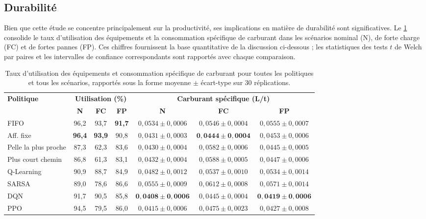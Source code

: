 \documentclass[11pt,a4paper]{article}
\begin{document}
\subsection{Durabilité}
\label{sec:sustainability}

Bien que cette étude se concentre principalement sur la productivité, ses implications en matière de durabilité sont significatives.
Le \cref{tab:efficiency} consolide le taux d'utilisation des équipements et la consommation spécifique de carburant dans les scénarios nominal (N), de forte charge (FC) et de fortes pannes (FP). Ces chiffres fournissent la base quantitative de la discussion ci-dessous ; les statistiques des tests $t$ de Welch par paires et les intervalles de confiance correspondants sont rapportés avec chaque comparaison.

\begin{table}[H]
\centering
\caption{Taux d'utilisation des équipements et consommation spécifique de carburant pour toutes les politiques et tous les scénarios, rapportés sous la forme moyenne $\pm$ écart-type sur 30 réplications.}
\label{tab:efficiency}
\footnotesize\setlength{\tabcolsep}{3pt}
\begin{tabular}{lcccccc}
\toprule
\multirow{2}{*}{\textbf{Politique}}
  & \multicolumn{3}{c}{\textbf{Utilisation (\%)}}
  & \multicolumn{3}{c}{\textbf{Carburant spécifique (L/t)}} \\
\cmidrule(lr){2-4}\cmidrule(lr){5-7}
  & \textbf{N} & \textbf{FC} & \textbf{FP}
  & \textbf{N}     & \textbf{FC}    & \textbf{FP} \\
\midrule
FIFO            & 96,2 & 93,7 & \textbf{91,7}  & $0{,}0534\pm0{,}0006$ & $0{,}0546\pm0{,}0004$ & $0{,}0555\pm0{,}0007$ \\
Aff. fixe       & \textbf{96,4} & \textbf{93,9} & 90,8  & $0{,}0431\pm0{,}0003$ & $\mathbf{0{,}0444\pm0{,}0004}$ & $0{,}0453\pm0{,}0006$ \\
Pelle la plus proche & 87,3 & 62,3 & 83,6  & $0{,}0430\pm0{,}0004$ & $0{,}0582\pm0{,}0006$ & $0{,}0445\pm0{,}0005$ \\
Plus court chemin & 86,8 & 61,3 & 83,1  & $0{,}0432\pm0{,}0004$ & $0{,}0588\pm0{,}0005$ & $0{,}0447\pm0{,}0006$ \\
Q-Learning      & 90,9 & 88,7 & 84,9  & $0{,}0482\pm0{,}0012$ & $0{,}0537\pm0{,}0010$ & $0{,}0534\pm0{,}0014$ \\
SARSA           & 89,0 & 78,6 & 86,6  & $0{,}0555\pm0{,}0009$ & $0{,}0612\pm0{,}0008$ & $0{,}0571\pm0{,}0014$ \\
DQN             & 91,7 & 90,5 & 85,8  & $\mathbf{0{,}0408\pm0{,}0006}$ & $0{,}0445\pm0{,}0004$ & $\mathbf{0{,}0419\pm0{,}0006}$ \\
PPO             & 94,5 & 79,5 & 86,0  & $0{,}0415\pm0{,}0006$ & $0{,}0475\pm0{,}0023$ & $0{,}0427\pm0{,}0008$ \\
\bottomrule
\end{tabular}
\end{table}
\end{document}

